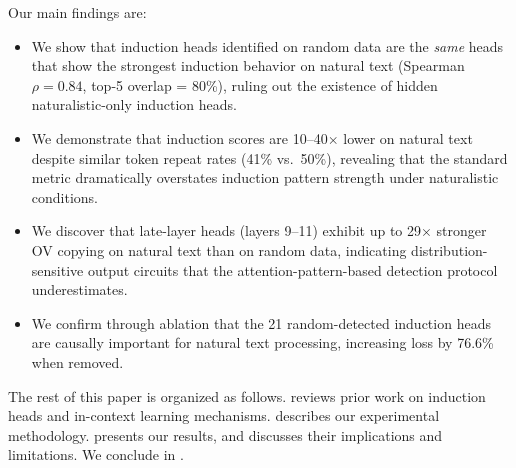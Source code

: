 Our main findings are:
\begin{itemize}[leftmargin=*,itemsep=0pt,topsep=0pt]
    \item We show that induction heads identified on random data are the \emph{same} heads that show the strongest induction behavior on natural text (Spearman $\rho = 0.84$, top-5 overlap = 80\%), ruling out the existence of hidden naturalistic-only induction heads.
    \item We demonstrate that induction scores are 10--40$\times$ lower on natural text despite similar token repeat rates (41\% vs.\ 50\%), revealing that the standard metric dramatically overstates induction pattern strength under naturalistic conditions.
    \item We discover that late-layer heads (layers 9--11) exhibit up to 29$\times$ stronger OV copying on natural text than on random data, indicating distribution-sensitive output circuits that the attention-pattern-based detection protocol underestimates.
    \item We confirm through ablation that the 21 random-detected induction heads are causally important for natural text processing, increasing loss by 76.6\% when removed.
\end{itemize}

The rest of this paper is organized as follows.
 reviews prior work on induction heads and in-context learning mechanisms.
 describes our experimental methodology.
 presents our results, and  discusses their implications and limitations.
We conclude in .
